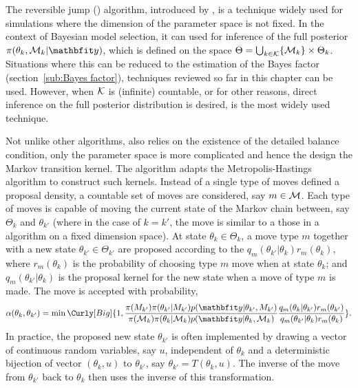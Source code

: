 The reversible jump \mcmc (\rjmcmc) algorithm, introduced by
\cite{Green:1995dg}, is a technique widely used for simulations where the
dimension of the parameter space is not fixed. In the context of Bayesian
model selection, it can used for inference of the full posterior
$\pi(\theta_k,\calM_k|\data)$, which is defined on the space $\Theta =
\bigcup_{k\in\mathcal{K}}\{\mathcal{M}_k\}\times\Theta_k$. Situations where this can be
reduced to the estimation of the Bayes factor (section~\ref{sub:Bayes
  factor}), techniques reviewed so far in this chapter can be used. However,
when $\mathcal{K}$ is (infinite) countable, or for other reasons, direct inference
on the full posterior distribution is desired, \rjmcmc is the most widely used
technique.

Not unlike other \mcmc algorithms, \rjmcmc also relies on the existence of the
detailed balance condition, only the parameter space is more complicated and
hence the design the Markov transition kernel. The \rjmcmc algorithm adapts
the Metropolis-Hastings algorithm to construct such kernels.  Instead of a
single type of moves defined a proposal density, a countable set of moves are
considered, say $m\in\mathcal{M}$. Each type of moves is capable of moving the
current state of the Markov chain between, say $\Theta_k$ and $\theta_{k'}$
(where in the case of $k = k'$, the move is similar to a those in a \mcmc
algorithm on a fixed dimension space). At state $\theta_k\in\Theta_k$, a move
type $m$ together with a new state $\theta_{k'}\in\Theta_{k'}$ are proposed
according to the $q_m(\theta_{k'}|\theta_k)r_m(\theta_k)$, where
$r_m(\theta_k)$ is the probability of choosing type $m$ move when at state
$\theta_k$; and $q_m(\theta_{k'}|\theta_k)$ is the proposal kernel for the new
state when a move of type $m$ is made. The move is accepted with probability,
\begin{equation}
  \alpha(\theta_k,\theta_{k'}) =
  \min\Curly[Big]{1,
    \frac{\pi(M_{k'})\pi(\theta_{k'}|M_{k'})p(\data|\theta_{k'},M_{k'})}
    {\pi(\calM_k)\pi(\theta_k|\calM_k)p(\data|\theta_k,\calM_k)}
    \frac{q_m(\theta_k|\theta_{k'})r_m(\theta_{k'})}
    {q_m(\theta_{k'}|\theta_k)r_m(\theta_k)}
  }.
\end{equation}
In practice, the proposed new state $\theta_{k'}$ is often implemented by
drawing a vector of continuous random variables, say $u$, independent of
$\theta_k$ and a deterministic bijection of vector $(\theta_k,u)$ to
$\theta_{k'}$, say $\theta_{k'} = T(\theta_k,u)$. The inverse of the move from
$\theta_{k'}$ back to $\theta_k$ then uses the inverse of this transformation.
